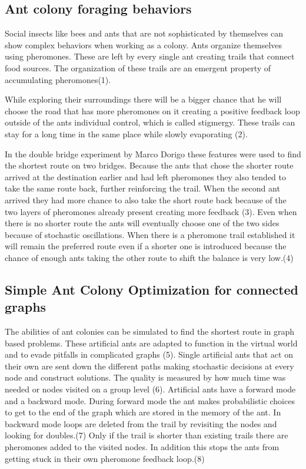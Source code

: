 
\subsection{Ant colony foraging behaviors}


Social insects like bees and ants that are not sophisticated by themselves can show complex behaviors when working as a colony. Ants organize themselves using pheromones. These are left by every single ant creating trails that connect food sources. The organization of these trails are an emergent property of accumulating pheromones(1). 

While exploring their surroundings there will be a bigger chance that he will choose the road that has more pheromones on it creating a positive feedback loop outside of the ants individual control, which is called stigmergy. These trails can stay for a long time in the same place while slowly evaporating (2). 

In the double bridge experiment by Marco Dorigo these features were used to find the shortest route on two bridges. Because the ants that chose the shorter route arrived at the destination earlier and had left pheromones they also tended to take the same route back, further reinforcing the trail. When the second ant arrived they had more chance to also take the short route back because of the two layers of pheromones already present creating more feedback (3). Even when there is no shorter route the ants will eventually choose one of the two sides because of stochastic oscillations. When there is a pheromone trail established it will remain the preferred route even if a shorter one is introduced because the chance of enough ants taking the other route to shift the balance is very low.(4)

\subsection{Simple Ant Colony Optimization for connected graphs}

The abilities of ant colonies can be simulated to find the shortest route in graph based problems. These artificial ants are adapted to function in the virtual world and to evade pitfalls in complicated graphs (5).  
Single artificial ants that act on their own are sent down the different paths making stochastic decisions at every node and construct solutions. The quality is measured by how much time was needed or nodes visited on a group level (6). Artificial ants have a forward mode and a backward mode. During forward mode the ant makes probabilistic choices to get to the end of the graph which are stored in the memory of the ant. In backward mode loops are deleted from the trail by revisiting the nodes and looking for doubles.(7) Only if the trail is shorter than existing trails there are pheromones added to the visited nodes. In addition this stops the ants from getting stuck in their own pheromone feedback loop.(8) 

